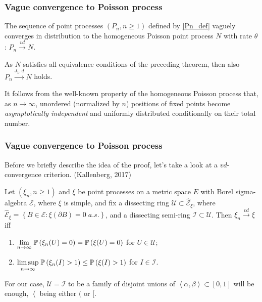 \documentclass[12pt,pdf,aspectratio=169,t]{beamer}
\begin{document}
    \begin{frame}
        \frametitle{Vague convergence to Poisson process}
        \begin{theorem}[convergence of $P_n$]
            The sequence of point processes
            $\left(P_n, n \geq 1\right)$ defined by \eqref{Pn_def}
            vaguely converges in distribution to the
            homogeneous Poisson point process $N$ with rate $\theta$:
            $P_n \overset{vd}{\longrightarrow} N$.

        \end{theorem}
        As $N$ satisfies all equivalence conditions of the preceding theorem,
        then also $P_n \overset{J_1,d}{\longrightarrow} N$ holds.

        It follows from the well-known property of 
        the homogeneous Poisson process that, 
        as $n \to \infty$, unordered (normalized by $n$) 
        positions of fixed points 
        become \emph{asymptotically independent}
        and uniformly distributed conditionally 
        on their total number. 
    \end{frame}
    \begin{frame}
        \frametitle{Vague convergence to Poisson process}
        Before we briefly describe the idea of the proof, let's take a look at
        a $vd$-convergence criterion. (Kallenberg, 2017)
        \begin{theorem}
            Let $\left(\xi_n, n\geq 1\right)$ and $\xi$ be point processes
            on a metric space $E$ with Borel sigma-algebra $\mathcal{E}$, where $\xi$ is simple, and fix a dissecting ring
            $\mathcal{U} \subset \hat{\mathcal{E}}_{\xi}$,
            where 
            $\hat{\mathcal{E}}_{\xi} = \left\{B \in \mathcal{E} : \xi(\partial B) = 0 \;a.s.\right\}$,
            and a dissecting semi-ring $\mathcal{I} \subset \mathcal{U}$.
            Then $\xi_n \overset{vd}{\longrightarrow} \xi$ iff
            \begin{enumerate}
                \item $\underset{n\to\infty}{\lim}\;\P{\xi_n(U) = 0} = \P{\xi(U) = 0}$ for $U\in\mathcal{U}$;
        \item $\underset{n\to\infty}{\limsup}\; \P{\xi_n(I) > 1} \leq \P{\xi(I) > 1}$ for $I \in \mathcal{I}$.
            \end{enumerate}
        \end{theorem}
        For our case, $\mathcal{U} = \mathcal{I}$ to be a family of
        disjoint unions of $\left<\alpha, \beta\right> \subset [0, 1]$
        will be enough, $\left<\right.$ being either $($ or $[$.
    \end{frame}
\end{document}
